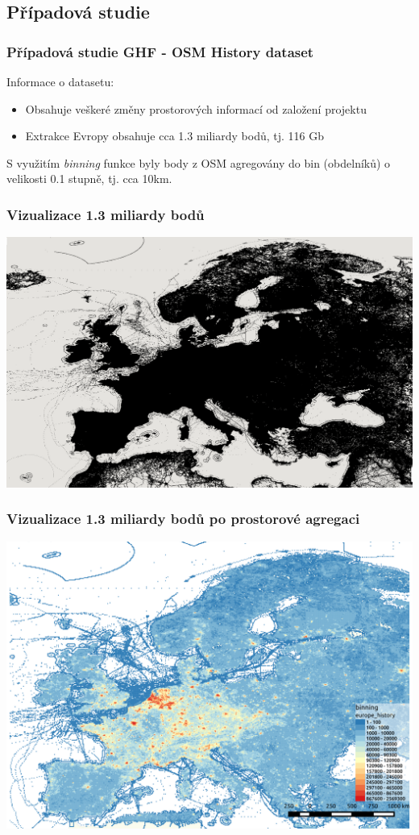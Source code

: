 \documentclass[unicode,bookmarksnumbered]{beamer}
\begin{document}
	\subsection{Případová studie}		
		\begin{frame}
			\frametitle{Případová studie GHF - OSM History dataset}
			Informace o datasetu:
			\begin{itemize}
				\item  Obsahuje veškeré změny prostorových informací od založení projektu
				\item  Extrakce Evropy obsahuje cca 1.3 miliardy bodů, tj. 116 Gb
			\end{itemize}
			S využitím \textit{binning} funkce byly body z OSM agregovány do bin (obdelníků) o velikosti 0.1 stupně, tj. cca 10km.
		\end{frame}	
			
		\begin{frame}
			\frametitle{Vizualizace 1.3 miliardy bodů}
			\centering
			\includegraphics[width=1\textwidth]{./img/motivace/eu_all.png}
		\end{frame}
	
		\begin{frame}
			\frametitle{Vizualizace 1.3 miliardy bodů po prostorové agregaci}
			\centering
			\includegraphics[width=1\textwidth]{./img/spatial/history.png}
		\end{frame}
	
\end{document}
